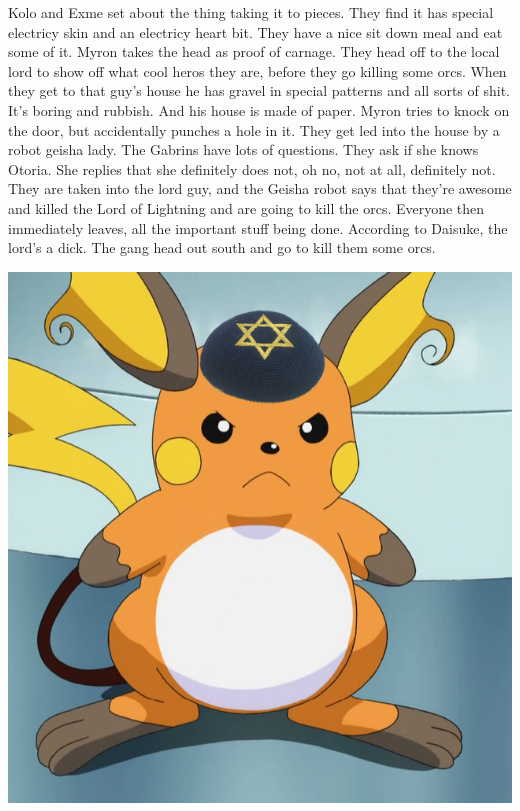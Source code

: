 Kolo and Exme set about the thing taking it to pieces. They find it has special electricy skin and an electricy heart bit. They have a nice sit down meal and eat some of it. Myron takes the head as proof of carnage. They head off to the local lord to show off what cool heros they are, before they go killing some orcs. When they get to that guy’s house he has gravel in special patterns and all sorts of shit. It’s boring and rubbish. And his house is made of paper. Myron tries to knock on the door, but accidentally punches a hole in it. They get led into the house by a robot geisha lady. The Gabrins have lots of questions. They ask if she knows Otoria. She replies that she definitely does not, oh no, not at all, definitely not. They are taken into the lord guy, and the Geisha robot says that they’re awesome and killed the Lord of Lightning and are going to kill the orcs. Everyone then immediately leaves, all the important stuff being done. According to Daisuke, the lord’s a dick. The gang head out south and go to kill them some orcs.\medskip


\begin{center}
\includegraphics[width=\textwidth]{./content/img/raijew.png}
\begin{figure}[h]
\end{figure}
\end{center}



\vspace*{5mm}



\clearpage